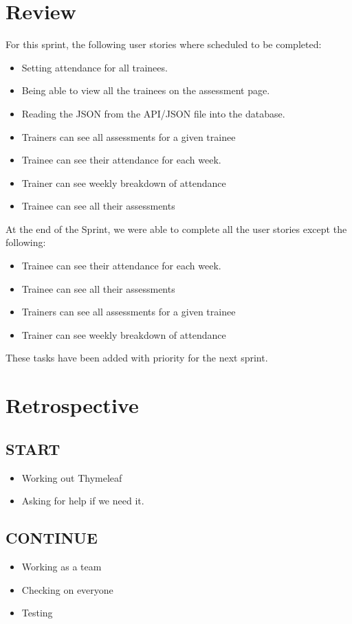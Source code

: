 \documentclass[]{report}
\begin{document}
		\section*{Review}
			For this sprint, the following user stories where scheduled to be completed:
			\begin{itemize}
				\item Setting attendance for all trainees.
				\item Being able to view all the trainees on the assessment page.
				\item Reading the JSON from the API/JSON file into the database.
				\item Trainers can see all assessments for a given trainee
				\item Trainee can see their attendance for each week.
				\item Trainer can see weekly breakdown of attendance
				\item Trainee can see all their assessments
			\end{itemize}
			At the end of the Sprint, we were able to complete all the user stories except the following:
			\begin{itemize}
				\item Trainee can see their attendance for each week.
				\item Trainee can see all their assessments
				\item Trainers can see all assessments for a given trainee
				\item Trainer can see weekly breakdown of attendance
			\end{itemize}
			These tasks have been added with priority for the next sprint.
		\section*{Retrospective}
			\subsection*{START}
				\begin{itemize}
					\item Working out Thymeleaf
					\item Asking for help if we need it.
				\end{itemize}
			\subsection*{CONTINUE}
				\begin{itemize}
					\item Working as a team
					\item Checking on everyone
					\item Testing
				\end{itemize}
\end{document}
